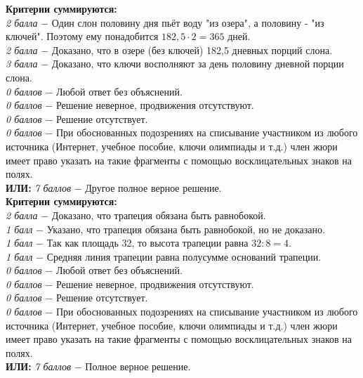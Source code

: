  \textbf{Критерии суммируются:} \\
\textit{2 балла} $-$ Один слон половину дня пьёт воду "из озера", а половину - "из ключей". Поэтому ему понадобится $182,5 \cdot 2=365$ дней.\\
\textit{2 балла} $-$ Доказано, что в озере (без ключей) 182,5 дневных порций слона.\\
\textit{3 балла} $-$ Доказано, что ключи восполняют за день половину дневной порции слона.\\
\textit{0 баллов} $-$ Любой ответ без объяснений.\\
\textit{0 баллов} $-$ Решение неверное, продвижения отсутствуют.\\
\textit{0 баллов} $-$ Решение отсутствует.\\
\textit{0 баллов} $-$ При обоснованных подозрениях на списывание участником из любого источника (Интернет, учебное пособие, ключи олимпиады и т.д.) член жюри имеет право указать на такие фрагменты с помощью восклицательных знаков на полях. \\

\textbf{ИЛИ:}
\textit{7 баллов} $-$ Другое полное верное решение.\\



 \textbf{Критерии суммируются:} \\
\textit{2 балла} $-$ Доказано, что трапеция обязана быть равнобокой.\\
\textit{1 балл} $-$ Указано, что трапеция обязана быть равнобокой, но не доказано.\\
\textit{1 балл} $-$ Так как площадь 32, то высота трапеции равна $32:8=4$.\\
\textit{1 балл} $-$ Средняя линия трапеции равна полусумме оснований трапеции.\\
\textit{0 баллов} $-$ Любой ответ без объяснений.\\
\textit{0 баллов} $-$ Решение неверное, продвижения отсутствуют.\\
\textit{0 баллов} $-$ Решение отсутствует.\\
\textit{0 баллов} $-$ При обоснованных подозрениях на списывание участником из любого источника (Интернет, учебное пособие, ключи олимпиады и т.д.) член жюри имеет право указать на такие фрагменты с помощью восклицательных знаков на полях.\\

\textbf{ИЛИ:}
\textit{7 баллов} $-$ Полное верное решение.\\


